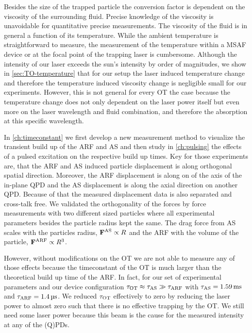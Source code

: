 Besides the size of the trapped particle the conversion factor is dependent on 
the viscosity of the surrounding fluid. Precise knowledge of the viscosity is 
unavoidable for quantitative precise measurements. The viscosity of the fluid 
is in general a function of its temperature. While the ambient temperature is 
straightforward to measure, the measurement of the temperature within a MSAF 
device or at the focal point of the trapping laser is cumbersome. Although the 
intensity of our laser exceeds the sun's intensity by order of magnitudes, we 
show in \cref{sec:TO-temperature} that for our setup the laser induced 
temperature change and therefore the temperature induced viscosity change is 
negligible small for our experiments. However, this is not general for every OT 
the case because the temperature change does not only dependent on the laser 
power itself but even more on the laser wavelength and fluid combination, and 
therefore the absorption at this specific wavelength.

In \cref{ch:timeconstant} we first develop a new measurement method to 
visualize the transient build up of the ARF and AS and then study in 
\cref{ch:pulsing} the effects of a pulsed excitation on the respective build up 
times. Key for those experiments are, that the ARF and AS induced particle 
displacement is along orthogonal spatial direction. Moreover, the ARF 
displacement is along on of the axis of the in-plane QPD and the AS 
displacement is along the axial direction on another QPD. Because of that the 
measured displacement data is also separated and cross-talk free. We validated 
the orthogonality of the forces by force measurements with two different sized 
particles where all experimental parameters besides the particle radius kept 
the same. The drag force from AS scales with the particles radius, $\vb{F}^{\mathrm{AS}}\propto 
R$ and the ARF with the volume of the particle, $\vb{F}^{\mathrm{ARF}}\propto R^{3}$.

However, without modifications on the OT we are not able to measure any of 
those effects because the timeconstant of the OT is much larger than the 
theoretical build up time of the ARF. In fact, for our set of experimental 
parameters and our device configuration $\tau_{\mathrm{OT}} \approx \tau_{\mathrm{AS}} \gg \tau_{\mathrm{ARF}}$ with 
$\tas = \SI{1.59}{\ms}$ and $\tarf = \SI{1.4}{\us}$. We reduced $\tau_{\mathrm{OT}}$ 
effectively to zero by reducing the laser power to almost zero such that there 
is no effective trapping by the OT. We still need some laser power because this 
beam is the cause for the measured intensity at any of the (Q)PDs.

